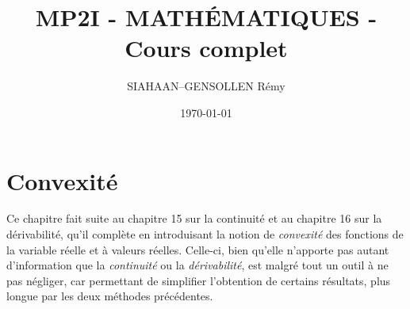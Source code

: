 \documentclass[a4paper,french,bookmarks]{report}
\begin{document}
\title{MP2I - \MakeUppercase{Mathématiques} - Cours complet}
\author{SIAHAAN--GENSOLLEN Rémy}
\date{\today}
\fancyhf{}
\renewcommand{\headrulewidth}{0pt}
\fancyhead[LO]{\GillSansMTMedium\color{white5}\leftmark: \rightmark}
    \fancyfoot[RO,LE]{\GillSansMTMedium\color{white5}\thepage\;/\;\pageref{LastPage}}
\renewcommand{\thesection}{\Roman{section}} 
\renewcommand{\thesubsection}{\thesection.\arabic{subsection}}
\renewcommand{\thesubsubsection}{ \alph{subsubsection})}

\renewcommand{\initcours}[0]{

    \begin{tcolorbox}[
        breakable,
        enhanced,
        interior style      = {left color=main2!12,right color=main6!12,middle color=main4!8},
        borderline north    = {.5pt}{0pt}{main2!10},
        borderline south    = {.5pt}{0pt}{main2!10},
        borderline west     = {.5pt}{0pt}{main2!10},
        borderline east     = {.5pt}{0pt}{main2!10},
        sharp corners       = downhill,
        arc                 = 0 cm,
        boxrule             = 0pt,
        drop fuzzy shadow   = black!50!white,
        frame hidden,
        before skip balanced = 0.4cm,
    ]
        \sffamily
        \minitoc
    \end{tcolorbox}
}

\dominitoc

{
    \sffamily
    \tableofcontents
}

\chapter{Convexité}

Ce chapitre fait suite au chapitre 15 sur la continuité et au chapitre
16 sur la dérivabilité, qu'il complète en introduisant la notion de
\textit{convexité} des fonctions de la variable réelle et à valeurs
réelles. Celle-ci, bien qu'elle n'apporte pas autant d'information que
la \textit{continuité} ou la \textit{dérivabilité}, est malgré tout un
outil à ne pas négliger, car permettant de simplifier l'obtention de
certains résultats, plus longue par les deux méthodes précédentes.
\end{document}
